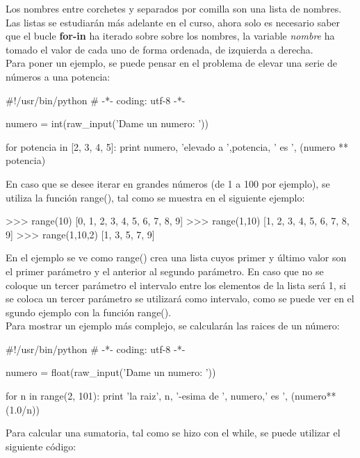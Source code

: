 Los nombres entre corchetes y separados por comilla son una lista de nombres. Las listas se estudiarán más adelante en el curso, ahora solo es necesario saber que el bucle \textbf{for-in} ha iterado sobre sobre los nombres, la variable \textit{nombre} ha tomado el valor de cada uno de forma ordenada, de izquierda a derecha.\\

Para poner un ejemplo, se puede pensar en el problema de elevar una serie de números a una potencia:\\

\begin{pyglist} [language=python]
#!/usr/bin/python
# -*- coding: utf-8 -*-

numero = int(raw_input('Dame un numero: '))

for potencia in [2, 3, 4, 5]:
    print numero, 'elevado a ',potencia, ' es ', (numero ** potencia)
\end{pyglist}

En caso que se desee iterar en grandes números (de 1 a 100 por ejemplo), se utiliza la función range(), tal como se muestra en el siguiente ejemplo:\\

\begin{pyglist} [language=python]
>>> range(10)
[0, 1, 2, 3, 4, 5, 6, 7, 8, 9]
>>> range(1,10)
[1, 2, 3, 4, 5, 6, 7, 8, 9]
>>> range(1,10,2)
[1, 3, 5, 7, 9]
\end{pyglist}

En el ejemplo se ve como range() crea una lista cuyos primer y último valor son el primer parámetro y el anterior al segundo parámetro. En caso que no se coloque un tercer parámetro el intervalo entre los elementos de la lista será 1, si se coloca un tercer parámetro se utilizará como intervalo, como se puede ver en el sgundo ejemplo con la función range().\\

Para mostrar un ejemplo más complejo, se calcularán las raices de un número:\\

\begin{pyglist} [language=python]
#!/usr/bin/python
# -*- coding: utf-8 -*-

numero = float(raw_input('Dame un numero: '))

for n in range(2, 101):
    print 'la raiz', n, '-esima de ', numero,' es ', (numero**(1.0/n))
\end{pyglist}

Para calcular una sumatoria, tal como se hizo con el while, se puede utilizar el siguiente código:\\

